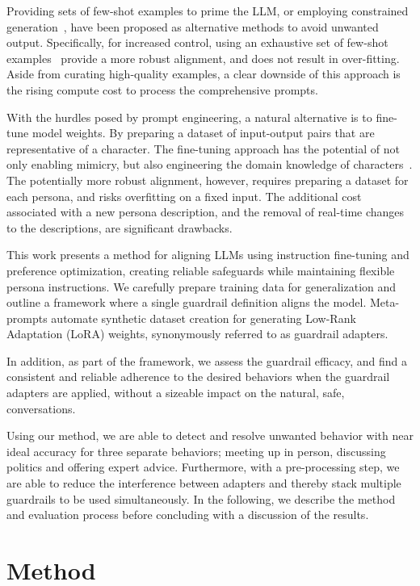\documentclass[letterpaper]{article}
\begin{document}
Providing sets of few-shot examples to prime the LLM, or employing constrained generation~\cite{loulasyntactic, zhao2024probabilistic, lew2023sequential}, have been proposed as alternative methods to avoid unwanted output. Specifically, for increased control, using an exhaustive set of few-shot examples~\cite{agarwal2024many} provide a more robust alignment, and does not result in over-fitting. 
Aside from curating high-quality examples, a clear downside of this approach is the rising compute cost to process the comprehensive prompts.

With the hurdles posed by prompt engineering, a natural alternative is to fine-tune model weights. By preparing a dataset of input-output pairs that are representative of a character. The fine-tuning approach has the potential of not only enabling mimicry, but also engineering the domain knowledge of characters~\cite{zhang2023instruction, shao2023character}.
The potentially more robust alignment, however, requires preparing a dataset for each persona, and risks overfitting on a fixed input. The additional cost associated with a new persona description, and the removal of real-time changes to the descriptions, are significant drawbacks.

This work presents a method for aligning LLMs using instruction fine-tuning and preference optimization, creating reliable safeguards while maintaining flexible persona instructions. We carefully prepare training data for generalization and outline a framework where a single guardrail definition aligns the model. Meta-prompts automate synthetic dataset creation for generating Low-Rank Adaptation (LoRA) weights, synonymously referred to as guardrail adapters.  

In addition, as part of the framework, we assess the guardrail efficacy, and find a consistent and reliable adherence to the desired behaviors when the guardrail adapters are applied, without a sizeable impact on the natural, safe, conversations.

Using our method, we are able to detect and resolve unwanted behavior with near ideal accuracy for three separate behaviors; meeting up in person, discussing politics and offering expert advice. Furthermore, with a pre-processing step, we are able to reduce the interference between adapters and thereby stack multiple guardrails to be used simultaneously. In the following, we describe the method and evaluation process before concluding with a discussion of the results.
\section{Method}
\end{document}
